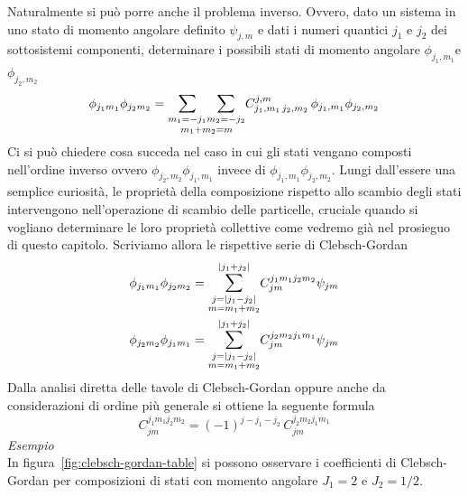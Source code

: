 Naturalmente si può porre anche il problema inverso.
Ovvero, dato un sistema in uno stato di momento angolare definito $\psi_{j,m}$ e dati i numeri quantici $j_{1}$ e $j_{2}$ dei sottosistemi componenti, determinare i possibili stati di momento angolare  $\phi_{j_{1},m_{1}}$e $\phi_{j_{2},m_{2}}$
\begin{equation}
    \phi_{j_{1}m_{1}} \phi_{j_{2}m_{2}} =  \underset{m_{1}+m_{2}=m}{\mathlarger{\sum}_{m_{1}=-j_{1}} \mathlarger{\sum}_{ m_{2}=-j_{2}}}
    C^{j,m}_{j_{1},m_{1} \, j_{2},m_{2}} \, \phi_{j_{1},m_{1}}\phi_{j_{2},m_{2}}
    \label{eq:inverse-clebsch-gordan}
\end{equation}
Ci si può chiedere cosa succeda nel caso in cui gli stati vengano composti nell’ordine inverso ovvero $\phi_{j_{2},m_{2}} \phi_{j_{1},m_{1}}$ invece di $\phi_{j_{1},m_{1}}\phi_{j_{2},m_{2}}$.
Lungi dall’essere una semplice curiosità, le proprietà della composizione rispetto allo scambio degli stati intervengono nell’operazione di scambio delle particelle, cruciale quando si vogliano determinare le loro proprietà collettive come vedremo già nel prosieguo di questo capitolo.
Scriviamo allora le rispettive serie di Clebsch-Gordan
\begin{gather*}
    \phi_{j_{1}m_{1}} \phi_{j_{2}m_{2}} = \mathlarger{\sum}_{\substack{j=| j_{1}-j_{2}| \\ m = m_{1}+m_{2}} }^{| j_{1}+j_{2}|} C_{jm}^{j_{1}m_{1}j_{2}m_{2}} \psi_{jm}\\
    \phi_{j_{2}m_{2}} \phi_{j_{1}m_{1}} = \mathlarger{\sum}_{\substack{j=| j_{1}-j_{2}| \\ m = m_{1}+m_{2}} }^{| j_{1}+j_{2}|} C_{jm}^{j_{2}m_{2}j_{1}m_{1}} \psi_{jm}
\end{gather*}
Dalla analisi diretta delle tavole di Clebsch-Gordan oppure anche da considerazioni di ordine più generale si ottiene la seguente formula
\[
    C_{jm}^{j_{1}m_{1}j_{2}m_{2}} = (-1)^{j-j_1-j_2} \, C_{jm}^{j_{2}m_{2}j_{1}m_{1}}
\]
\emph{Esempio} \\
In figura~\ref{fig:clebsch-gordan-table} si possono osservare i coefficienti di Clebsch-Gordan per composizioni di stati con
momento angolare $J_1=2$ e $ J_2 = 1/2$.
